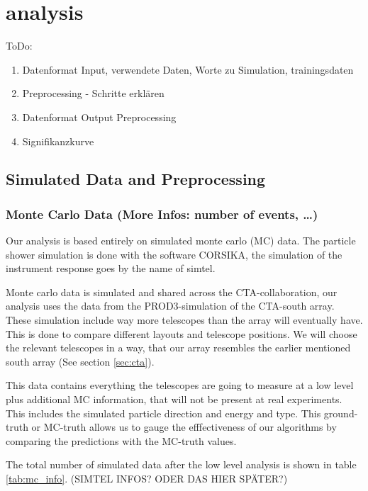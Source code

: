 \chapter{analysis}\label{analysis}

ToDo:
\begin{enumerate}[nosep]
    \item Datenformat Input, verwendete Daten, Worte zu Simulation, trainingsdaten
    \item Preprocessing - Schritte erklären
    \item Datenformat Output Preprocessing
    \item Signifikanzkurve
\end{enumerate}

\section{Simulated Data and Preprocessing}

\subsection{Monte Carlo Data (More Infos: number of events, \ldots)}
Our analysis is based entirely on simulated monte carlo (MC) data.
The particle shower simulation is done with the software CORSIKA, 
the simulation of the instrument response goes by the name of simtel.

Monte carlo data is simulated and shared across the CTA-collaboration, 
our analysis uses the data from the PROD3-simulation of 
the CTA-south array. These simulation include way more telescopes 
than the array will eventually have. This is done to compare
different layouts and telescope positions.
We will choose the relevant telescopes in a way, that
our array resembles the earlier mentioned south array (See section \ref{sec:cta}).

This data contains everything the telescopes are going to measure
at a low level
plus additional MC information, that will not be present at real experiments.
This includes the simulated particle direction and energy and type.
This ground-truth or MC-truth allows us to gauge the efffectiveness of our 
algorithms by comparing the predictions with the MC-truth values.

The total number of simulated data after the low level analysis 
is shown in table \ref{tab:mc_info}. (SIMTEL INFOS? ODER DAS HIER SPÄTER?)


